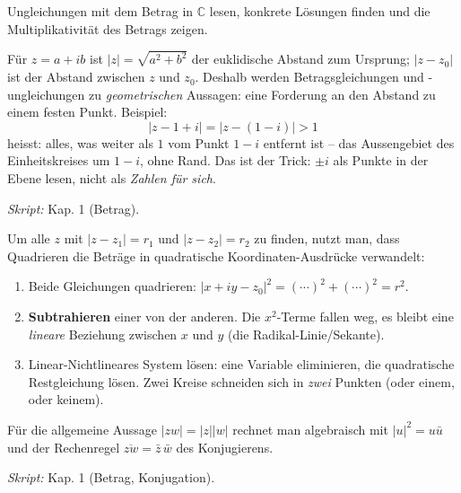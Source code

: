 

Ungleichungen mit dem Betrag in $\mathbb C$ lesen, konkrete Lösungen
finden und die Multiplikativität des Betrags zeigen.

\begin{werkzeugkasten}
Für $z=a+ib$ ist $|z|=\sqrt{a^2+b^2}$ der euklidische Abstand zum
Ursprung; $|z-z_0|$ ist der Abstand zwischen $z$ und $z_0$. Deshalb werden
Betragsgleichungen und -ungleichungen zu \emph{geometrischen} Aussagen:
eine Forderung an den Abstand zu einem festen Punkt. Beispiel:
\[
  |z-1+i|=|z-(1-i)|>1
\]
heisst: alles, was weiter als $1$ vom Punkt $1-i$ entfernt ist -- das
Aussengebiet des Einheitskreises um $1-i$, ohne Rand. Das ist der Trick:
$\pm i$ als Punkte in der Ebene lesen, nicht als \emph{Zahlen für sich}.

\textit{Skript:} Kap. 1 (Betrag).
\end{werkzeugkasten}

\begin{werkzeugkasten}
Um alle $z$ mit $|z-z_1|=r_1$ und $|z-z_2|=r_2$ zu finden, nutzt man,
dass Quadrieren die Beträge in quadratische Koordinaten-Ausdrücke
verwandelt:
\begin{enumerate}
  \item Beide Gleichungen quadrieren:
        $|x+iy-z_0|^2=(\cdots)^2+(\cdots)^2=r^2$.
  \item \textbf{Subtrahieren} einer von der anderen. Die
        $x^2$-Terme fallen weg, es bleibt eine \emph{lineare} Beziehung
        zwischen $x$ und $y$ (die Radikal-Linie/Sekante).
  \item Linear-Nichtlineares System lösen: eine Variable eliminieren, die
        quadratische Restgleichung lösen. Zwei Kreise schneiden sich in
        \emph{zwei} Punkten (oder einem, oder keinem).
\end{enumerate}
Für die allgemeine Aussage $|zw|=|z||w|$ rechnet man algebraisch mit
$|u|^2=u\bar u$ und der Rechenregel $\overline{zw}=\bar z\,\bar w$ des
Konjugierens.

\textit{Skript:} Kap. 1 (Betrag, Konjugation).
\end{werkzeugkasten}

